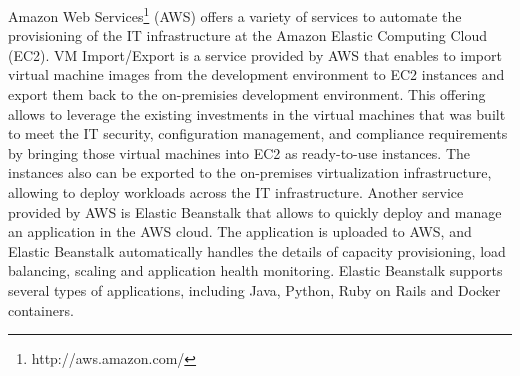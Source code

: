 Amazon Web Services\footnote{http://aws.amazon.com/} (AWS) offers a variety of services to automate
the provisioning of the IT infrastructure at the Amazon Elastic Computing Cloud (EC2). VM Import/Export is a
service provided by AWS that enables to import virtual machine images from the development environment
to EC2 instances and export them back to the on-premisies development environment. This offering allows
to leverage the existing investments in the virtual machines that was built to meet the IT security,
configuration management, and compliance requirements by bringing those virtual machines into EC2 as
ready-to-use instances. The instances also can be exported to the on-premises virtualization infrastructure,
allowing to deploy workloads across the IT infrastructure. Another service provided by AWS is Elastic Beanstalk
that allows to quickly deploy and manage an application in the AWS cloud. The application is uploaded to AWS,
and Elastic Beanstalk automatically handles the details of capacity provisioning, load balancing,
scaling and application health monitoring. Elastic Beanstalk supports several types of applications,
including Java, Python, Ruby on Rails and Docker containers.

